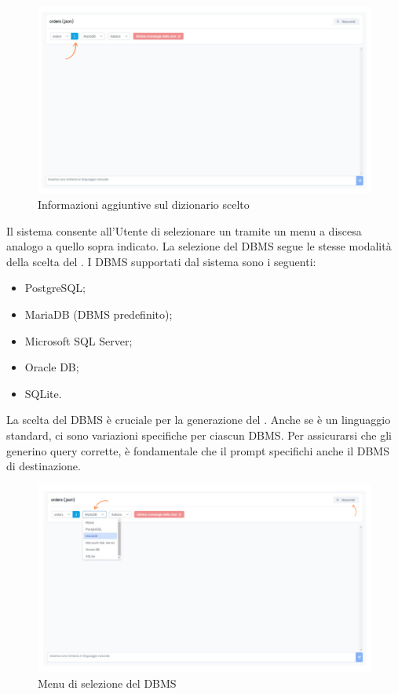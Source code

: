 \begin{figure}[H]
  \centering
  \includegraphics[width=1\textwidth]{assets/info_dizionario.png}
  \caption{Informazioni aggiuntive sul dizionario scelto}
\end{figure}


\par Il sistema consente all'Utente di selezionare un  tramite un menu a discesa analogo a quello sopra indicato. La selezione del DBMS segue le stesse modalità della scelta del . I DBMS supportati dal sistema sono i seguenti:
\begin{itemize}
  \item PostgreSQL;
  \item MariaDB (DBMS predefinito);
  \item Microsoft SQL Server;
  \item Oracle DB;
  \item SQLite.
\end{itemize}

\vspace{0.5\baselineskip}
\par La scelta del DBMS è cruciale per la generazione del . Anche se  è un linguaggio standard, ci sono variazioni specifiche per ciascun DBMS. Per assicurarsi che gli  generino query corrette, è fondamentale che il prompt specifichi anche il DBMS di destinazione.

\begin{figure}[H]
  \centering
  \includegraphics[width=1\textwidth]{assets/cambio_dbms.png}
  \caption{Menu di selezione del DBMS}
\end{figure}

